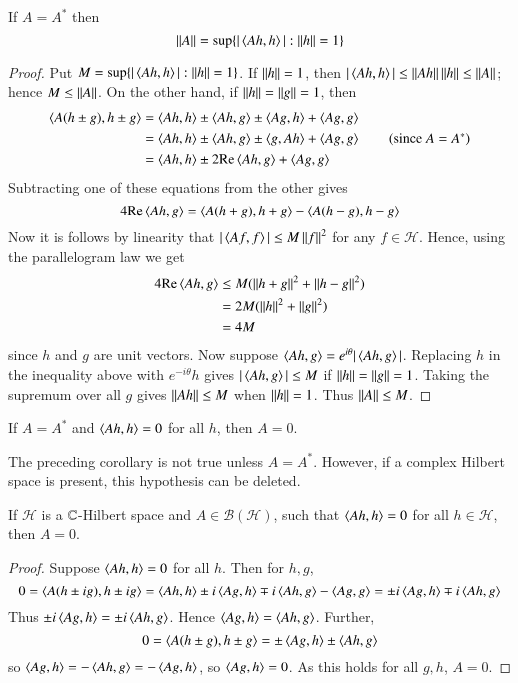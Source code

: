 \begin{prop}
    If $A = A^*$ then $$\norm{A} = \sup\{|\inner{Ah}{h}|:\norm{h} = 1\}$$
\end{prop}
\begin{proof}
    Put $M = \sup\{|\inner{Ah}{h}|:\norm{h} = 1\}$. If $\norm{h} = 1$, then $|\inner{Ah}{h}| \leq \norm{Ah}\norm{h} \leq \norm{A}$; hence $M \leq \norm{A}$. On the other hand, if $\norm{h} = \norm{g} = 1$, then \begin{align*}
        \inner{A(h\pm g)}{h\pm g} &= \inner{Ah}{h}\pm \inner{Ah}{g}\pm\inner{Ag}{h}+\inner{Ag}{g} \\
        &= \inner{Ah}{h}\pm \inner{Ah}{g}\pm\inner{g}{Ah}+\inner{Ag}{g} \tag{since $A= A^*$} \\
        &= \inner{Ah}{h}\pm 2\text{Re}\inner{Ah}{g} + \inner{Ag}{g}
    \end{align*}
    Subtracting one of these equations from the other gives $$4\text{Re}\inner{Ah}{g} = \inner{A(h+g)}{h+g} -\inner{A(h-g)}{h-g}$$
    Now it is follows by linearity that $|\inner{Af}{f}| \leq M\norm{f}^2$ for any $f \in \mathscr{H}$. Hence, using the parallelogram law we get \begin{align*}
        4\text{Re}\inner{Ah}{g} &\leq M(\norm{h+g}^2+\norm{h-g}^2) \\
        &= 2M(\norm{h}^2+\norm{g}^2) \\
        &= 4M
    \end{align*}
    since $h$ and $g$ are unit vectors. Now suppose $\inner{Ah}{g} = e^{i\theta}|\inner{Ah}{g}|$. Replacing $h$ in the inequality above with $e^{-i\theta}h$ gives $|\inner{Ah}{g}| \leq M$ if $\norm{h} = \norm{g} = 1$. Taking the supremum over all $g$ gives $\norm{Ah} \leq M$ when $\norm{h} = 1$. Thus $\norm{A} \leq M$.
\end{proof}

\begin{cor}
    If $A = A^*$ and $\inner{Ah}{h} = 0$ for all $h$, then $A = 0$.
\end{cor}

The preceding corollary is not true unless $A = A^*$. However, if a complex Hilbert space is present, this hypothesis can be deleted.

\begin{prop}
    If $\mathscr{H}$ is a $\C$-Hilbert space and $A \in \mathscr{B}(\mathscr{H})$, such that $\inner{Ah}{h} = 0$ for all $h \in \mathscr{H}$, then $A = 0$.
\end{prop}
\begin{proof}
    Suppose $\inner{Ah}{h} = 0$ for all $h$. Then for $h,g$, $$0= \inner{A(h\pm ig)}{h\pm ig} = \inner{Ah}{h}\pm i\inner{Ag}{h} \mp i\inner{Ah}{g}-\inner{Ag}{g} = \pm i\inner{Ag}{h} \mp i\inner{Ah}{g}$$
    Thus $\pm i\inner{Ag}{h} = \pm i \inner{Ah}{g}$. Hence $\inner{Ag}{h} = \inner{Ah}{g}$. Further, $$0 = \inner{A(h\pm g)}{h\pm g} = \pm\inner{Ag}{h}\pm\inner{Ah}{g}$$
    so $\inner{Ag}{h} = -\inner{Ah}{g} = -\inner{Ag}{h}$, so $\inner{Ag}{h} = 0$. As this holds for all $g,h$, $A = 0$.
\end{proof}

